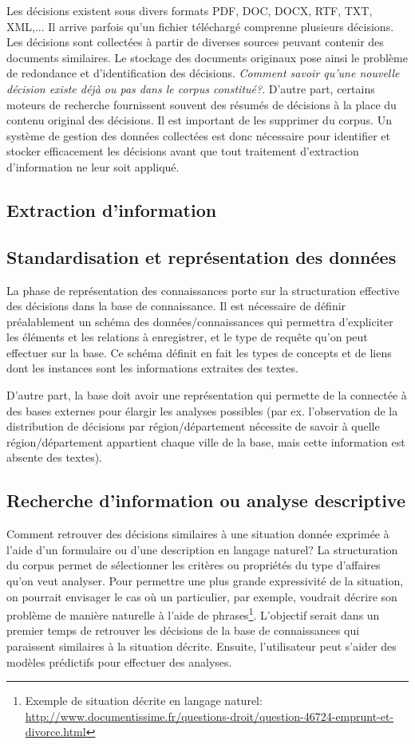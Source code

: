 Les décisions existent sous divers formats PDF, DOC, DOCX, RTF, TXT, XML,... Il arrive parfois qu'un fichier téléchargé comprenne plusieurs décisions. Les décisions sont collectées à partir de diverses sources peuvant contenir des documents similaires. Le stockage des documents originaux pose ainsi le problème de redondance et d'identification des décisions. \textit{Comment savoir qu'une nouvelle décision existe déjà ou pas dans le corpus constitué?}. D'autre part, certains moteurs de recherche fournissent souvent des résumés de décisions à la place du contenu original des décisions. Il est important de les supprimer du corpus. Un système de gestion des données collectées est donc nécessaire pour identifier et stocker efficacement les décisions avant que tout traitement d'extraction d'information ne leur soit appliqué.

\subsection{Extraction d'information}

\subsection{Standardisation et représentation des données}
La phase de représentation des connaissances porte sur la structuration effective des décisions dans la base de connaissance. Il est nécessaire de définir préalablement un schéma des données/connaissances qui permettra d'expliciter les éléments et les relations à enregistrer, et le type de requête qu'on peut effectuer sur la base. Ce schéma définit en fait les types de concepts et de liens dont les instances sont les informations extraites des textes.

D'autre part, la base doit avoir une représentation qui permette de la connectée à des bases externes pour élargir les analyses possibles (par ex. l'observation de la distribution de décisions par région/département nécessite de savoir à quelle région/département appartient chaque ville de la base, mais cette information est absente des textes).

\subsection{Recherche d'information ou analyse descriptive}
Comment retrouver des décisions similaires à une situation donnée exprimée à l'aide d'un formulaire ou d'une description en langage naturel? La structuration du corpus permet de sélectionner les critères ou propriétés du type d'affaires qu'on veut analyser. Pour permettre une plus grande expressivité de la situation, on pourrait envisager le cas où un particulier, par exemple, voudrait décrire son problème de manière naturelle à l'aide de phrases\footnote{Exemple de situation décrite en langage naturel: \url{http://www.documentissime.fr/questions-droit/question-46724-emprunt-et-divorce.html}}. L'objectif serait dans un premier temps de retrouver les décisions de la base de connaissances qui paraissent similaires à la situation décrite. Ensuite, l'utilisateur  peut s'aider des modèles prédictifs pour effectuer des analyses.


